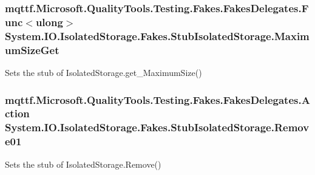 \hypertarget{class_system_1_1_i_o_1_1_isolated_storage_1_1_fakes_1_1_stub_isolated_storage_af74e89f7b0e56485ad93d4853915df36}{
\subsubsection[{Maximum\-Size\-Get}]{\setlength{\rightskip}{0pt plus 5cm}mqttf.\-Microsoft.\-Quality\-Tools.\-Testing.\-Fakes.\-Fakes\-Delegates.\-Func$<$ulong$>$ System.\-I\-O.\-Isolated\-Storage.\-Fakes.\-Stub\-Isolated\-Storage.\-Maximum\-Size\-Get}}\label{class_system_1_1_i_o_1_1_isolated_storage_1_1_fakes_1_1_stub_isolated_storage_af74e89f7b0e56485ad93d4853915df36}


Sets the stub of Isolated\-Storage.\-get\-\_\-\-Maximum\-Size()

\hypertarget{class_system_1_1_i_o_1_1_isolated_storage_1_1_fakes_1_1_stub_isolated_storage_ad1c670d2e74cb3a032ea854700d175b2}{
\subsubsection[{Remove01}]{\setlength{\rightskip}{0pt plus 5cm}mqttf.\-Microsoft.\-Quality\-Tools.\-Testing.\-Fakes.\-Fakes\-Delegates.\-Action System.\-I\-O.\-Isolated\-Storage.\-Fakes.\-Stub\-Isolated\-Storage.\-Remove01}}\label{class_system_1_1_i_o_1_1_isolated_storage_1_1_fakes_1_1_stub_isolated_storage_ad1c670d2e74cb3a032ea854700d175b2}


Sets the stub of Isolated\-Storage.\-Remove()

